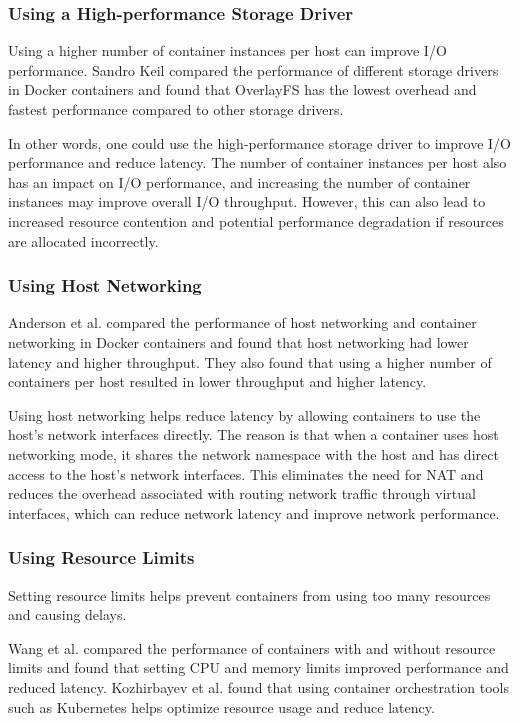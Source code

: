 \subsubsection{Using a High-performance Storage Driver}
Using a higher number of container instances per host can improve I/O performance.
Sandro Keil compared the performance of different storage drivers in Docker containers \cite{b30} and
found that OverlayFS has the lowest overhead and fastest performance compared to other
storage drivers\cite{b30,b31,b32}.

In other words, one could use the high-performance storage driver to improve
I/O performance and reduce latency. The number of container instances per host also
has an impact on I/O performance, and increasing the number of container instances may improve
overall I/O throughput. However, this can also lead to increased resource contention and potential
performance degradation if resources are allocated incorrectly.


\subsubsection{Using Host Networking}
Anderson et al.\cite{b33} compared the performance of host networking and container networking in Docker
containers and found that host networking had lower latency and higher throughput. They also
found that using a higher number of containers per host resulted in lower throughput and higher latency.

Using host networking helps reduce latency by allowing containers to use the host's network
interfaces directly\cite{b34,b35}. The reason is that when a container uses host networking mode, it shares
the network namespace with the host and has direct access to the host's network interfaces.
This eliminates the need for NAT and reduces the overhead associated with routing network traffic
through virtual interfaces, which can reduce network latency and improve network performance.

\subsubsection{Using Resource Limits}
Setting resource limits helps prevent containers from using too many resources and causing delays.

Wang et al.\cite{b36} compared the performance of containers with and without resource limits and found
that setting CPU and memory limits improved performance and reduced latency.
Kozhirbayev et al.\cite{b37} found that using container orchestration tools such as Kubernetes helps
optimize resource usage and reduce latency.


